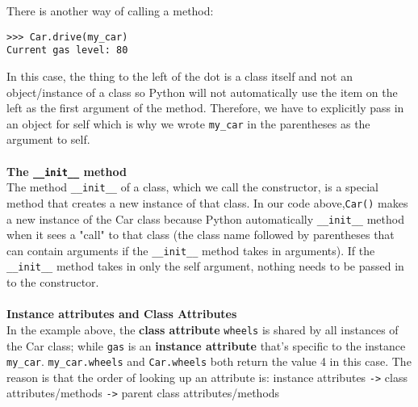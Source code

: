 There is another way of calling a method:
\begin{lstlisting}
>>> Car.drive(my_car)
Current gas level: 80
\end{lstlisting}
In this case, the thing to the left of the dot is a class itself and not an object/instance of a class so Python will not automatically use the item on the left as the first argument of the method. Therefore, we have to explicitly pass in an object for self which is why we wrote \lstinline{my_car} in the parentheses as the argument to self. \\
\\
\textbf{The \lstinline{__init__} method} \\
The method \lstinline{__init__} of a class, which we call the constructor, is a special method that creates a new instance of that class. In our code above,\lstinline{Car()} makes a new instance of the Car class because Python automatically \lstinline{__init__} method when it sees a "call" to that class (the class name followed by parentheses that can contain arguments if the \lstinline{__init__} method takes in arguments). If the \lstinline{__init__} method takes in only the self argument, nothing needs to be passed in to the constructor. \\
\\
\textbf{Instance attributes and Class Attributes} \\
In the example above, the \textbf{class attribute} \lstinline{wheels} is shared by all instances of the Car class; while \lstinline{gas} is an \textbf{instance attribute} that’s specific to the instance \lstinline{my_car}.
\lstinline{my_car.wheels} and \lstinline{Car.wheels} both return the value 4 in this case. The reason is that the order of looking up an attribute is: instance attributes \lstinline{->} class attributes/methods \lstinline{->} parent class attributes/methods \\
